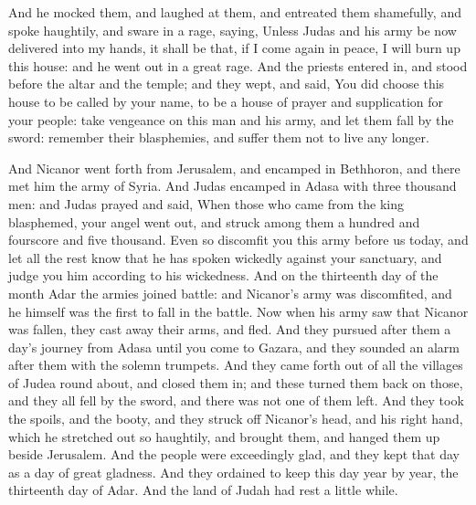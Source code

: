 {And he mocked them, and laughed at them, and
 entreated them shamefully, and spoke haughtily,
and sware in a rage, saying, Unless Judas and his army be now delivered into my hands, it shall be that, if I come again in peace, I will burn up this house: and he went out in a great rage.
And the priests entered in, and stood before the altar and the temple; and they wept, and said,
You did choose this house to be called by your name, to be a house of prayer and supplication for your people:
take vengeance on this man and his army, and let them fall by the sword: remember their blasphemies, and suffer them not to live any longer.
\par }{\PP {}And Nicanor went forth from Jerusalem, and encamped in Bethhoron, and there met him the army of Syria.
And Judas encamped in Adasa with three thousand men: and Judas prayed and said,
When those who came from the king blasphemed, your angel went out, and struck among them a hundred and fourscore and five thousand.
Even so discomfit you this army before us today, and let all the rest know that he has spoken wickedly against your sanctuary, and judge you him according to his wickedness.
And on the thirteenth day of the month Adar the armies joined battle: and Nicanor’s army was discomfited, and he himself was the first to fall in the battle.
Now when his army saw that Nicanor was fallen, they cast away their arms, and fled.
And they pursued after them a day’s journey from Adasa until you come to
 Gazara, and they sounded an alarm after them with the
 solemn trumpets.
And they came forth out of all the villages of Judea round about, and
 closed them in; and these turned them back on those, and they all fell by the sword, and there was not one of them left.
And they took the spoils, and the booty, and they struck off Nicanor’s head, and his right hand, which he stretched out so haughtily, and brought them, and
 hanged them up beside Jerusalem.
And the people were exceedingly glad, and they kept that day as a day of great gladness.
And
 they ordained to keep this day year by year,
{} the thirteenth day of Adar.
And the land of Judah had rest
 a little while.

}
